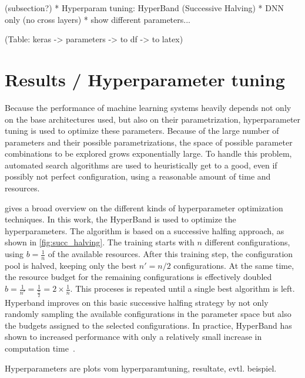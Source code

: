 \documentclass[10pt,final,journal,a4paper,oneside,twocolumn]{IEEEtran}
\begin{document}
(subsection?)
* Hyperparam tuning: HyperBand (Successive Halving)
* DNN only (no cross layers)
* show different parameters...

(Table: keras -> parameters -> to df -> to latex)


\section{Results / Hyperparameter tuning}
Because the performance of machine learning systems heavily depends not only on the base architectures used, but also on their parametrization, hyperparameter tuning is used to optimize these parameters. Because of the large number of parameters and their possible parametrizations, the space of possible parameter combinations to be explored grows exponentially large. To handle this problem, automated search algorithms are used to heuristically get to a good, even if possibly not perfect configuration, using a reasonable amount of time and resources.

\cite{Feurer.2019} gives a broad overview on the different kinds of hyperparameter optimization techniques. In this work, the HyperBand \cite{li2017hyperband} is used to optimize the hyperparameters. The algorithm is based on a successive halfing approach, as shown in \autoref{fig:succ_halving}.
The training starts with $n$ different configurations, using $b=\frac{1}{n}$ of the available resources. After this training step, the configuration pool is halved, keeping only the best $n' = n/2$ configurations. At the same time, the resource budget for the remaining configurations is effectively doubled $b=\frac{1}{n'}=\frac{1}{\frac{n}{2}} = 2\times\frac{1}{n}$.
This proceses is repeated until a single best algorithm is left. Hyperband improves on this basic successive halfing strategy by not only randomly sampling the available configurations in the parameter space but also the budgets assigned to the selected configurations. In practice, HyperBand has shown to increased performance with only a relatively small increase in computation time~\cite[p. 17]{Feurer.2019}.

Hyperparameters are   
plots vom hyperparamtuning, resultate, evtl. beispiel.
\end{document}
